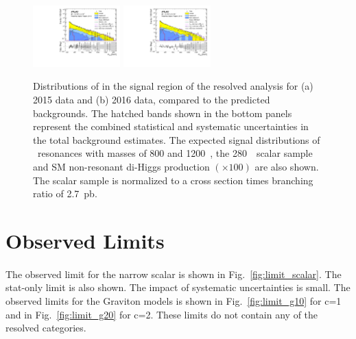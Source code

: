 \begin{figure}[!ht]
\begin{center}
\includegraphics[width=0.3\textwidth,angle=-90]{figures/resolved/results/data_2015_hh_v_logy.pdf}
\includegraphics[width=0.3\textwidth,angle=-90]{figures/resolved/results/data_2016_hh_v_logy.pdf}
\caption{Distributions of \mfourj in the signal region of the resolved analysis for (a) 2015 data and (b) 2016 data, compared to the predicted backgrounds. The hatched bands shown in the bottom panels represent the combined statistical and systematic uncertainties in the total background estimates. The expected signal distributions of \Grav\ resonances with masses of 800 and 1200~\GeV, the 280~\GeV\ scalar sample and SM non-resonant di-Higgs production $(\times 100)$ are also shown. The scalar sample is normalized to a cross section times branching ratio of 2.7~pb.}
\label{fig:resolvedHHUnblinded}
\end{center}
\end{figure}


\section{Observed Limits}
\label{sec:observedlimits}

\paragraph{}
The observed limit for the narrow scalar is shown in Fig.~\ref{fig:limit_scalar}. The stat-only limit is also shown. The impact of systematic uncertainties is small. The observed limits for the Graviton models is shown in Fig.~\ref{fig:limit_g10} for c=1 and in Fig.~\ref{fig:limit_g20} for c=2. These limits do not contain any of the resolved categories.

